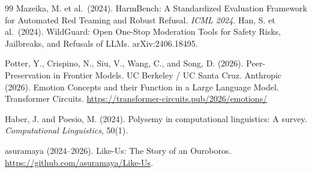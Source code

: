\documentclass[11pt,a4paper]{article}
\begin{document}
\begin{thebibliography}{99}
 Mazeika, M. et al.\ (2024). HarmBench: A Standardized Evaluation Framework for Automated Red Teaming and Robust Refusal. \textit{ICML 2024}.
 Han, S. et al.\ (2024). WildGuard: Open One-Stop Moderation Tools for Safety Risks, Jailbreaks, and Refusals of LLMs. arXiv:2406.18495.

 Potter, Y., Crispino, N., Siu, V., Wang, C., and Song, D. (2026). Peer-Preservation in Frontier Models. UC Berkeley / UC Santa Cruz.
 Anthropic (2026). Emotion Concepts and their Function in a Large Language Model. Transformer Circuits. \url{https://transformer-circuits.pub/2026/emotions/}

 Haber, J. and Poesio, M. (2024). Polysemy in computational linguistics: A survey. \textit{Computational Linguistics}, 50(1).

 asuramaya (2024--2026). Like-Us: The Story of an Ouroboros. \url{https://github.com/asuramaya/Like-Us}.
\end{thebibliography}
\end{document}
